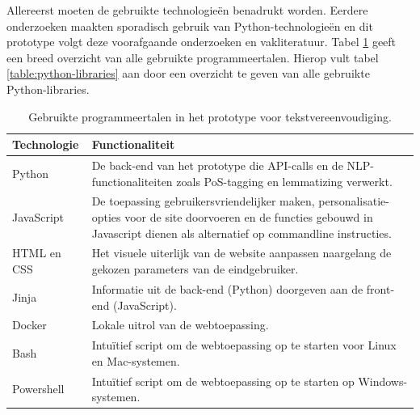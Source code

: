 Allereerst moeten de gebruikte technologieën benadrukt worden. Eerdere onderzoeken maakten sporadisch gebruik van Python-technologieën en dit prototype volgt deze voorafgaande onderzoeken en vakliteratuur. Tabel \ref{table:technologies} geeft een breed overzicht van alle gebruikte programmeertalen. Hierop vult tabel \ref{table:python-libraries} aan door een overzicht te geven van alle gebruikte Python-libraries.

\begin{center}
	\begin{table}[H]
	\begin{tabular}{ | m{4cm} | m{12cm} | } 
		\hline
		\textbf{Technologie} & \textbf{Functionaliteit} \\
		\hline
		Python & De back-end van het prototype die API-calls en de NLP-functionaliteiten zoals PoS-tagging en lemmatizing verwerkt. \\
		\hline
		JavaScript & De toepassing gebruikersvriendelijker maken, personalisatie-opties voor de site doorvoeren en de functies gebouwd in Javascript dienen als alternatief op commandline instructies. \\
		\hline
		HTML en CSS & Het visuele uiterlijk van de website aanpassen naargelang de gekozen parameters van de eindgebruiker. \\
		\hline
		Jinja & Informatie uit de back-end (Python) doorgeven aan de front-end (JavaScript).  \\
		\hline
		Docker & Lokale uitrol van de webtoepassing. \\
		\hline
		Bash & Intuïtief script om de webtoepassing op te starten voor Linux en Mac-systemen. \\
		\hline
		Powershell & Intuïtief script om de webtoepassing op te starten op Windows-systemen. \\
		\hline
	\end{tabular}
	\label{table:technologies}
	\caption{Gebruikte programmeertalen in het prototype voor tekstvereenvoudiging.}
	\end{table}
\end{center}

